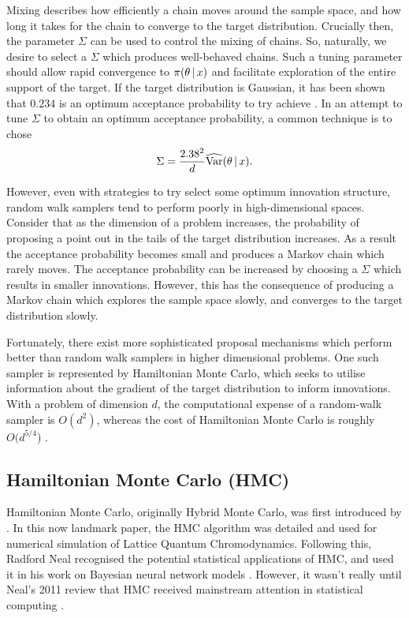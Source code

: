 Mixing describes how efficiently a chain moves around the sample space, and how long it
takes for the chain to converge to the target distribution.  Crucially then, the parameter
$\Sigma$ can be used to control the mixing of chains.  So, naturally, we desire to select
a $\Sigma$ which produces well-behaved chains.  Such a tuning parameter should allow rapid
convergence to $\pi(\theta \,|\, x)$ and facilitate exploration of the entire support of
the target. If the target distribution is Gaussian, it has been shown that $0.234$ is an
optimum acceptance probability to try achieve \parencite{roberts01}. In an attempt to tune
$\Sigma$ to obtain an optimum acceptance probability, a common technique is to chose 
\begin{equation*}
  \Sigma = \frac{2.38^2}{d} \widehat{\text{Var}}(\theta \,|\, x).
\end{equation*}

However, even with strategies to try select some optimum innovation structure, random walk
samplers tend to perform poorly in high-dimensional spaces. Consider that as the
dimension of a problem increases, the probability of proposing a point out in the tails of
the target distribution increases. As a result the acceptance probability becomes small and
produces a Markov chain which rarely moves. The acceptance probability can be increased
by choosing a $\Sigma$ which results in smaller innovations. However, this has the
consequence of producing a Markov chain which explores the sample space slowly, and
converges to the target distribution slowly.

Fortunately, there exist more sophisticated proposal mechanisms which perform better than
random walk samplers in higher dimensional problems. One such sampler is represented by
Hamiltonian Monte Carlo, which seeks to utilise information about the gradient of the
target distribution to inform innovations. With a problem of dimension $d$, the
computational expense of a random-walk sampler is $O(d^2)$, whereas the cost of
Hamiltonian Monte Carlo is roughly $O(d^{5/4}$) \parencite{creutz88}. 

\subsection{Hamiltonian Monte Carlo (HMC)}

Hamiltonian Monte Carlo, originally Hybrid Monte Carlo, was first introduced by
\textcite{duane87}. In this now landmark paper, the HMC algorithm was detailed and used
for numerical simulation of Lattice Quantum Chromodynamics. Following this, Radford Neal
recognised the potential statistical applications of HMC, and used it in his work on
Bayesian neural network models \parencite{neal95}. However, it wasn't really until Neal's
2011 review \parencite{neal11} that HMC received mainstream attention in statistical
computing \parencite{betancourt18}.


